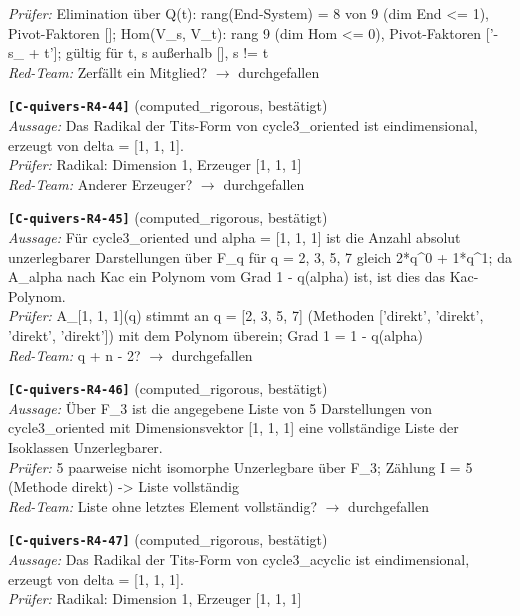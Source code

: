 \documentclass[11pt]{article}
\theoremstyle{definition}\newtheorem{definition}[theorem]{Definition}\newtheorem{remark}[theorem]{Remark}\newtheorem{observation}[theorem]{Numerical observation}
\begin{document}
\textit{Prüfer:} Elimination über Q(t): rang(End-System) = 8 von 9 (dim End <= 1), Pivot-Faktoren []; Hom(V\_s, V\_t): rang 9 (dim Hom <= 0), Pivot-Faktoren ['-s\_ + t']; gültig für t, s außerhalb [], s != t\\
\textit{Red-Team:} Zerfällt ein Mitglied? $\to$ durchgefallen\par\medskip
\noindent\textbf{\texttt{[C-quivers-R4-44]}} (computed\_rigorous, bestätigt)\\
\textit{Aussage:} Das Radikal der Tits-Form von cycle3\_oriented ist eindimensional, erzeugt von delta = [1, 1, 1].\\
\textit{Prüfer:} Radikal: Dimension 1, Erzeuger [1, 1, 1]\\
\textit{Red-Team:} Anderer Erzeuger? $\to$ durchgefallen\par\medskip
\noindent\textbf{\texttt{[C-quivers-R4-45]}} (computed\_rigorous, bestätigt)\\
\textit{Aussage:} Für cycle3\_oriented und alpha = [1, 1, 1] ist die Anzahl absolut unzerlegbarer Darstellungen über F\_q für q = 2, 3, 5, 7 gleich 2*q\textasciicircum{}0 + 1*q\textasciicircum{}1; da A\_alpha nach Kac ein Polynom vom Grad 1 - q(alpha) ist, ist dies das Kac-Polynom.\\
\textit{Prüfer:} A\_[1, 1, 1](q) stimmt an q = [2, 3, 5, 7] (Methoden ['direkt', 'direkt', 'direkt', 'direkt']) mit dem Polynom überein; Grad 1 = 1 - q(alpha)\\
\textit{Red-Team:} q + n - 2? $\to$ durchgefallen\par\medskip
\noindent\textbf{\texttt{[C-quivers-R4-46]}} (computed\_rigorous, bestätigt)\\
\textit{Aussage:} Über F\_3 ist die angegebene Liste von 5 Darstellungen von cycle3\_oriented mit Dimensionsvektor [1, 1, 1] eine vollständige Liste der Isoklassen Unzerlegbarer.\\
\textit{Prüfer:} 5 paarweise nicht isomorphe Unzerlegbare über F\_3; Zählung I = 5 (Methode direkt) -> Liste vollständig\\
\textit{Red-Team:} Liste ohne letztes Element vollständig? $\to$ durchgefallen\par\medskip
\noindent\textbf{\texttt{[C-quivers-R4-47]}} (computed\_rigorous, bestätigt)\\
\textit{Aussage:} Das Radikal der Tits-Form von cycle3\_acyclic ist eindimensional, erzeugt von delta = [1, 1, 1].\\
\textit{Prüfer:} Radikal: Dimension 1, Erzeuger [1, 1, 1]\\
\end{document}
